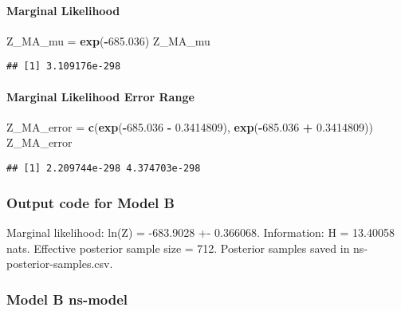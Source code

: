 \documentclass[
]{article}
\newenvironment{Shaded}{\begin{snugshade}}{\end{snugshade}}
\newcommand{\FloatTok}[1]{\textcolor[rgb]{0.00,0.00,0.81}{#1}}
\newcommand{\FunctionTok}[1]{\textcolor[rgb]{0.13,0.29,0.53}{\textbf{#1}}}
\newcommand{\NormalTok}[1]{#1}
\newcommand{\OtherTok}[1]{\textcolor[rgb]{0.56,0.35,0.01}{#1}}
\newcommand{\SpecialCharTok}[1]{\textcolor[rgb]{0.81,0.36,0.00}{\textbf{#1}}}
\begin{document}
\hypertarget{marginal-likelihood}{%
\paragraph{Marginal Likelihood}\label{marginal-likelihood}}

\begin{Shaded}
\begin{Highlighting}[]
\NormalTok{Z\_MA\_mu }\OtherTok{=} \FunctionTok{exp}\NormalTok{(}\SpecialCharTok{{-}}\FloatTok{685.036}\NormalTok{)}
\NormalTok{Z\_MA\_mu}
\end{Highlighting}
\end{Shaded}

\begin{verbatim}
## [1] 3.109176e-298
\end{verbatim}

\hypertarget{marginal-likelihood-error-range}{%
\paragraph{Marginal Likelihood Error
Range}\label{marginal-likelihood-error-range}}

\begin{Shaded}
\begin{Highlighting}[]
\NormalTok{Z\_MA\_error }\OtherTok{=} \FunctionTok{c}\NormalTok{(}\FunctionTok{exp}\NormalTok{(}\SpecialCharTok{{-}}\FloatTok{685.036} \SpecialCharTok{{-}} \FloatTok{0.3414809}\NormalTok{), }\FunctionTok{exp}\NormalTok{(}\SpecialCharTok{{-}}\FloatTok{685.036} \SpecialCharTok{+} \FloatTok{0.3414809}\NormalTok{))}
\NormalTok{Z\_MA\_error}
\end{Highlighting}
\end{Shaded}

\begin{verbatim}
## [1] 2.209744e-298 4.374703e-298
\end{verbatim}

\hypertarget{output-code-for-model-b}{%
\subsubsection{Output code for Model B}\label{output-code-for-model-b}}

Marginal likelihood: ln(Z) = -683.9028 +- 0.366068. Information: H =
13.40058 nats. Effective posterior sample size = 712. Posterior samples
saved in ns-posterior-samples.csv.

\hypertarget{model-b-ns-model}{%
\subsubsection{Model B ns-model}\label{model-b-ns-model}}
\end{document}
